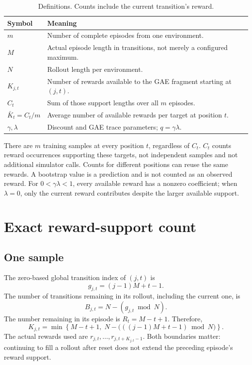 \documentclass[11pt,a4paper]{article}
\numberwithin{equation}{section}
\begin{document}
\begin{table}[htbp]\centering
\caption{Definitions. Counts include the current transition's reward.}
\begin{tabular}{@{}lp{11.4cm}@{}}\toprule
Symbol & Meaning \\\midrule
$m$ & Number of complete episodes from one environment. \\
$M$ & Actual episode length in transitions, not merely a configured maximum. \\
$N$ & Rollout length per environment. \\
$K_{j,t}$ & Number of rewards available to the GAE fragment starting at $(j,t)$. \\
$C_t$ & Sum of those support lengths over all $m$ episodes. \\
$\bar K_t=C_t/m$ & Average number of available rewards per target at position $t$. \\
$\gamma,\lambda$ & Discount and GAE trace parameters; $q=\gamma\lambda$. \\
\bottomrule\end{tabular}
\end{table}

There are $m$ training samples at every position $t$, regardless of $C_t$.
$C_t$ counts reward occurrences supporting these targets, not independent samples
and not additional simulator calls. Counts for different positions can reuse the
same rewards. A bootstrap value is a prediction and is not counted as an observed
reward. For $0<\gamma\lambda<1$, every available reward has a nonzero coefficient;
when $\lambda=0$, only the current reward contributes despite the larger available
support.

\section{Exact reward-support count}
\subsection{One sample}
The zero-based global transition index of $(j,t)$ is
\begin{equation}
 g_{j,t}=(j-1)M+t-1.
\end{equation}
The number of transitions remaining in its rollout, including the current one, is
\begin{equation}
 B_{j,t}=N-(g_{j,t}\bmod N).
\end{equation}
The number remaining in its episode is $R_t=M-t+1$. Therefore,
\begin{equation}\label{eq:K}
 \boxed{K_{j,t}=\min\left\{M-t+1,\;
 N-\bigl(((j-1)M+t-1)\bmod N\bigr)\right\}.}
\end{equation}
The actual rewards used are $r_{j,t},\ldots,r_{j,t+K_{j,t}-1}$.
Both boundaries matter: continuing to fill a rollout after reset does not extend
the preceding episode's reward support.
\end{document}
